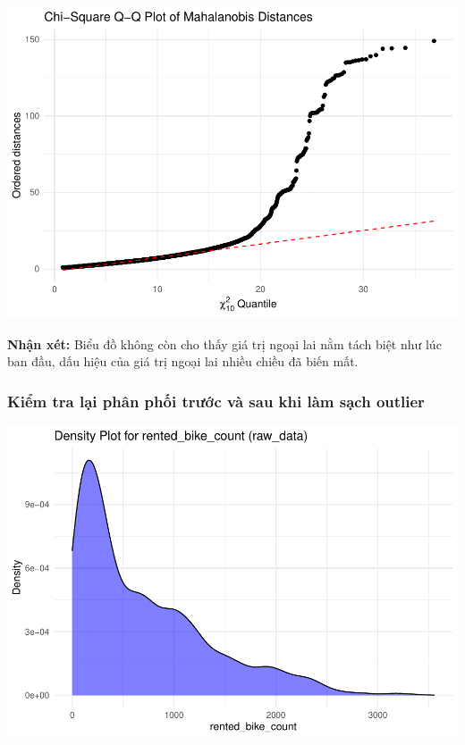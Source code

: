\documentclass[
  11pt,
  letterpaper,
]{article}
\begin{document}
\begin{center}\includegraphics{Final_Project_files/figure-latex/unnamed-chunk-14-1} \end{center}

\textbf{Nhận xét:} Biểu đồ không còn cho thấy giá trị ngoại lai nằm tách biệt như lúc ban đầu, dấu hiệu của giá trị ngoại lai nhiều chiều đã biến mất.

\subsubsection{Kiểm tra lại phân phối trước và sau khi làm sạch outlier}

\begin{center}\includegraphics[width=1.2\linewidth,]{Final_Project_files/figure-latex/unnamed-chunk-15-1} \end{center}
\end{document}
